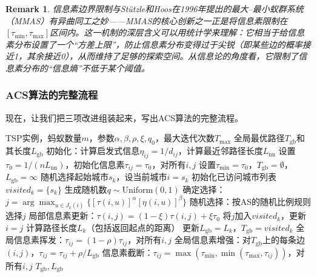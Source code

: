 \documentclass[lang=cn,zihao=-4,a4paper,fontset=windows]{beautybook}
\newtheorem*{remark}{\textbf{Remark}}
\begin{document}
\begin{remark}
信息素边界限制与Stützle和Hoos在1996年提出的最大--最小蚁群系统（MMAS）有异曲同工之妙——MMAS的核心创新之一正是将信息素限制在$[\tau_{\min}, \tau_{\max}]$区间内。这一机制的深层含义可以用统计学来理解：它相当于给信息素分布设置了一个“方差上限”，防止信息素分布变得过于尖锐（即某些边的概率接近1，其余接近0），从而维持了足够的探索空间。从信息论的角度看，它限制了信息素分布的“信息熵”不低于某个阈值。
\end{remark}

\subsubsection{ACS算法的完整流程}

现在，让我们把三项改进组装起来，写出ACS算法的完整流程。

\begin{algorithm}[H]
\caption{蚁群系统（Ant Colony System, ACS）算法}
\begin{algorithmic}[1]
\REQUIRE TSP实例，蚂蚁数量$m$，参数$\alpha, \beta, \rho, \xi, q_0$，最大迭代次数$T_{\max}$
\ENSURE 全局最优路径$T_{\text{gb}}$和其长度$L_{\text{gb}}$
\STATE 初始化：计算启发式信息$\eta_{ij} = 1/d_{ij}$，计算最近邻路径长度$L_{\text{nn}}$
\STATE 设置$\tau_0 = 1/(nL_{\text{nn}})$，初始化信息素$\tau_{ij} = \tau_0$，对所有$i,j$
\STATE 设置$\tau_{\min} = \tau_0$，$T_{\text{gb}} = \emptyset$，$L_{\text{gb}} = \infty$
        \STATE 随机选择起始城市$s_k$，设当前城市$i = s_k$
        \STATE 初始化已访问城市列表$visited_k = \{s_k\}$
            \STATE 生成随机数$q \sim \text{Uniform}(0,1)$
                \STATE 确定选择：$j = \arg\max_{u \in J_k(i)} \{[\tau(i,u)]^\alpha [\eta(i,u)]^\beta\}$
            \ELSE
                \STATE 随机选择：按AS的随机比例规则选择$j$
            \ENDIF
            \STATE 局部信息素更新：$\tau(i,j) = (1-\xi)\tau(i,j) + \xi\tau_0$
            \STATE 将$j$加入$visited_k$，更新$i = j$
        \ENDWHILE
        \STATE 计算路径长度$L_k$（包括返回起点的距离）
            \STATE 更新$L_{\text{gb}} = L_k$，$T_{\text{gb}} = visited_k$
        \ENDIF
    \ENDFOR
    \STATE 全局信息素挥发：$\tau_{ij} = (1-\rho)\tau_{ij}$，对所有$i,j$
    \STATE 全局信息素增强：对$T_{\text{gb}}$上的每条边$(i,j)$，$\tau_{ij} = \tau_{ij} + \rho/L_{\text{gb}}$
    \STATE 信息素截断：$\tau_{ij} = \max(\tau_{\min}, \min(\tau_{\max}, \tau_{ij}))$，对所有$i,j$
\ENDFOR
\RETURN $T_{\text{gb}}, L_{\text{gb}}$
\end{algorithmic}
\end{algorithm}
\end{document}
